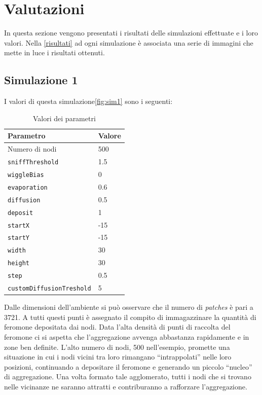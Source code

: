 \chapter{Valutazioni}
In questa sezione vengono presentati i risultati delle simulazioni effettuate e i loro valori.
Nella \cref{risultati} ad ogni simulazione è associata una serie di immagini che mette in luce i risultati ottenuti.
\section{Simulazione 1}\label{sim1}
I valori di questa simulazione\space \cref{fig:sim1} sono i seguenti:
\begin{table}[ht]
    \centering
    \caption{Valori dei parametri}
    \begin{tabular}{ll}
        \toprule
        Parametro                   & Valore \\
        \midrule
        Numero di nodi              & 500    \\
        \texttt{sniffThreshold}     & 1.5    \\
        \texttt{wiggleBias}         & 0      \\
        \texttt{evaporation}        & 0.6    \\
        \texttt{diffusion}          & 0.5    \\
        \texttt{deposit}            & 1      \\
        \texttt{startX}             & -15    \\
        \texttt{startY}             & -15    \\
        \texttt{width}              & 30     \\
        \texttt{height}             & 30     \\
        \texttt{step}               & 0.5    \\
        \texttt{customDiffusionTreshold} & 5 \\
        \bottomrule
    \end{tabular}\label{tab:parametri1}
\end{table}\newline
Dalle dimensioni dell'ambiente si può osservare che il numero di \textit{patches} è pari a 3721. A tutti questi punti è assegnato il compito di 
immagazzinare la quantità di feromone depositata dai nodi. 
Data l'alta densità di punti di raccolta del feromone ci si aspetta che l'aggregazione avvenga abbastanza rapidamente e in zone ben definite. 
L'alto numero di nodi, 500 nell'esempio, promette una situazione in cui i nodi vicini tra loro rimangano ``intrappolati'' nelle loro posizioni, continuando a depositare il feromone e 
generando un piccolo ``nucleo'' di aggregazione. Una volta formato tale agglomerato, tutti i nodi che si trovano nelle vicinanze ne saranno attratti
e contriburanno a rafforzare l'aggregazione.


